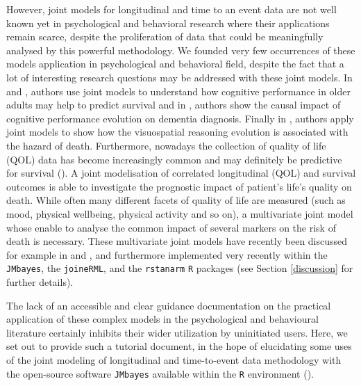 \documentclass[12pt]{article}
\begin{document}
However, joint models for longitudinal and time to an event data are not well known yet in psychological and behavioral research where their applications remain scarce, despite the proliferation of data that could be meaningfully analysed by this powerful methodology. We founded very few occurrences of these models application in psychological and behavioral field, despite the fact that a lot of interesting research questions may be addressed with these joint models. In \cite{Ghisletta_2006} and \cite{ghisletta2008application}, authors use joint models to understand how cognitive performance in older adults may help to predict survival and in \cite{McArdle_2005}, authors show the causal impact of cognitive performance evolution on dementia diagnosis. Finally in \cite{Muniz_2018}, authors apply joint models to show how the visuospatial reasoning evolution is associated with the hazard of death. Furthermore, nowadays the collection of quality of life (QOL) data has become increasingly common and may definitely be predictive for survival (\cite{gould_joint_2015}). A joint modelisation of correlated longitudinal (QOL) and survival outcomes is able to investigate the prognostic impact of patient's life's quality on death. While often many different facets of quality of life are measured (such as mood, physical wellbeing, physical activity and so on), a multivariate joint model whose enable to analyse the common impact of several markers on the risk of death is necessary. These multivariate joint models have recently been discussed for example in \cite{hickey2016joint} and \cite{he2016joint}, and furthermore implemented very recently within the \texttt{JMbayes}, the \texttt{joineRML}, and the \texttt{rstanarm} \texttt{R} packages (see Section \ref{discussion} for further details).

The lack of an accessible and clear guidance documentation on the practical application of these complex models in the psychological and behavioural literature certainly inhibits their wider utilization by uninitiated users. Here, we set out to provide such a tutorial document, in the hope of elucidating some uses of the joint modeling of longitudinal and time-to-event data methodology with the open-source software \texttt{JMbayes} available within the \texttt{R} environment (\cite{JMbayes}). 
\end{document}

